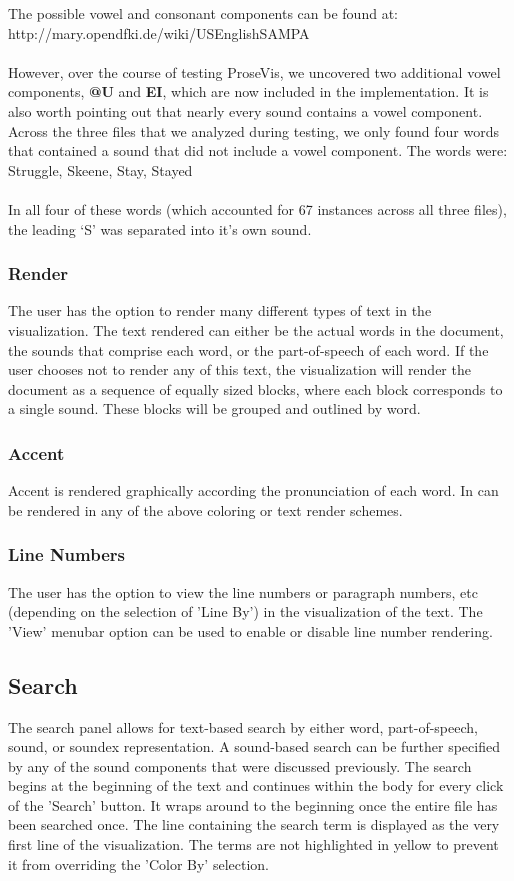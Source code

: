 \documentclass[fleqn]{article}
\begin{document}
The possible vowel and consonant components can be found at: \\
http://mary.opendfki.de/wiki/USEnglishSAMPA\\
\\
However, over the course of testing ProseVis, we uncovered two additional vowel components, {\bf @U} and {\bf EI}, which are now included in the implementation.  It is also worth pointing out that nearly every sound contains a vowel component.  Across the three files that we analyzed during testing, we only found four words that contained a sound that did not include a vowel component.  The words were:\\

Struggle, Skeene, Stay, Stayed\\
\\
In all four of these words (which accounted for 67 instances across all three files), the leading `S' was separated into it's own sound.

\subsubsection*{Render}
The user has the option to render many different types of text in the visualization. The text rendered can either be the actual words in the document, the sounds that comprise each word, or the part-of-speech of each word.  If the user chooses not to render any of this text, the visualization will render the document as a sequence of equally sized blocks, where each block corresponds to a single sound.  These blocks will be grouped and outlined by word.

\subsubsection*{Accent}
Accent is rendered graphically according the pronunciation of each word.  In can be rendered in any of the above coloring or text render schemes.

\subsubsection*{Line Numbers}
The user has the option to view the line numbers or paragraph numbers, etc (depending on the selection of 'Line By') in the visualization of the text. The 'View' menubar option can be used to enable or disable line number rendering.

\subsection{Search}
The search panel allows for text-based search by either word, part-of-speech, sound, or soundex representation.  A sound-based search can be further specified by any of the sound components that were discussed previously.  The search begins at the beginning of the text and continues within the body for every click of the 'Search' button. It wraps around to the beginning once the entire file has been searched once. The line containing the search term is displayed as the very first line of the visualization. The terms are not highlighted in yellow to prevent it from overriding the 'Color By' selection.
\end{document}
